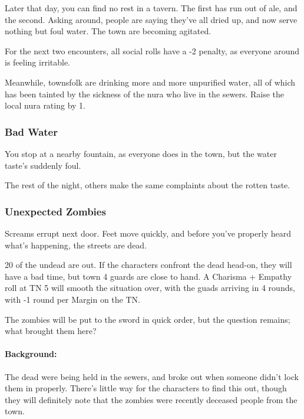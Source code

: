 \begin{boxtext}
	Later that day, you can find no rest in a tavern.  The first has run out of ale, and the second.  Asking around, people are saying they've all dried up, and now serve nothing but foul water.  The town are becoming agitated.
\end{boxtext}

For the next two encounters, all social rolls have a -2 penalty, as everyone around is feeling irritable.

Meanwhile, townsfolk are drinking more and more unpurified water, all of which has been tainted by the sickness of the nura who live in the sewers.  Raise the local nura rating by 1.




\subsubsection{Bad Water}

\begin{boxtext}
	You stop at a nearby fountain, as everyone does in the town, but the water taste's suddenly foul.

	The rest of the night, others make the same complaints about the rotten taste.
\end{boxtext}

\subsubsection{Unexpected Zombies}

\begin{boxtext}
	Screams errupt next door.  Feet move quickly, and before you've properly heard what's happening, the streets are dead.
\end{boxtext}

20 of the undead are out.  If the characters confront the dead head-on, they will have a bad time, but town 4 guards are close to hand.  A Charisma + Empathy roll at TN 5 will smooth the situation over, with the guads arriving in 4 rounds, with -1 round per Margin on the TN.

The zombies will be put to the sword in quick order, but the question remains; what brought them here?

\paragraph{Background:} The dead were being held in the sewers, and broke out when someone didn't lock them in properly.  There's little way for the characters to find this out, though they will definitely note that the zombies were recently deceased people from the town.


